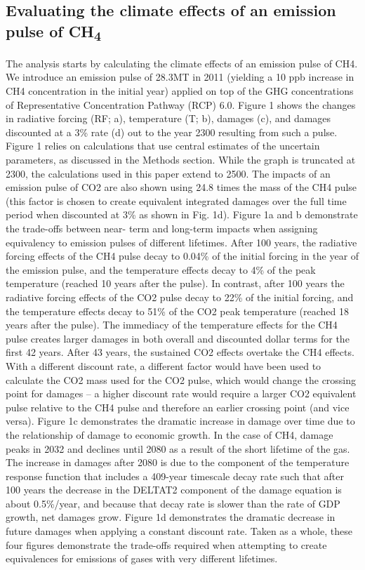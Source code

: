 \documentclass[gc, manuscript]{copernicus}
\begin{document}
\subsection{\texorpdfstring{Evaluating the climate effects of an
emission pulse of
CH\textsubscript{4}}{Evaluating the climate effects of an emission pulse of CH}}

The analysis starts by calculating the climate effects of an emission
pulse of CH4. We introduce an emission pulse of 28.3MT in 2011 (yielding
a 10 ppb increase in CH4 concentration in the initial year) applied on
top of the GHG concentrations of Representative Concentration Pathway
(RCP) 6.0. Figure 1 shows the changes in radiative forcing (RF; a),
temperature (T; b), damages (c), and damages discounted at a 3\% rate
(d) out to the year 2300 resulting from such a pulse. Figure 1 relies on
calculations that use central estimates of the uncertain parameters, as
discussed in the Methods section. While the graph is truncated at 2300,
the calculations used in this paper extend to 2500. The impacts of an
emission pulse of CO2 are also shown using 24.8 times the mass of the
CH4 pulse (this factor is chosen to create equivalent integrated damages
over the full time period when discounted at 3\% as shown in Fig. 1d).
Figure 1a and b demonstrate the trade-offs between near- term and
long-term impacts when assigning equivalency to emission pulses of
different lifetimes. After 100 years, the radiative forcing effects of
the CH4 pulse decay to 0.04\% of the initial forcing in the year of the
emission pulse, and the temperature effects decay to 4\% of the peak
temperature (reached 10 years after the pulse). In contrast, after 100
years the radiative forcing effects of the CO2 pulse decay to 22\% of
the initial forcing, and the temperature effects decay to 51\% of the
CO2 peak temperature (reached 18 years after the pulse). The immediacy
of the temperature effects for the CH4 pulse creates larger damages in
both overall and discounted dollar terms for the first 42 years. After
43 years, the sustained CO2 effects overtake the CH4 effects. With a
different discount rate, a different factor would have been used to
calculate the CO2 mass used for the CO2 pulse, which would change the
crossing point for damages -- a higher discount rate would require a
larger CO2 equivalent pulse relative to the CH4 pulse and therefore an
earlier crossing point (and vice versa). Figure 1c demonstrates the
dramatic increase in damage over time due to the relationship of damage
to economic growth. In the case of CH4, damage peaks in 2032 and
declines until 2080 as a result of the short lifetime of the gas. The
increase in damages after 2080 is due to the component of the
temperature response function that includes a 409-year timescale decay
rate such that after 100 years the decrease in the DELTAT2 component of
the damage equation is about 0.5\%/year, and because that decay rate is
slower than the rate of GDP growth, net damages grow. Figure 1d
demonstrates the dramatic decrease in future damages when applying a
constant discount rate. Taken as a whole, these four figures demonstrate
the trade-offs required when attempting to create equivalences for
emissions of gases with very different lifetimes.
\end{document}

